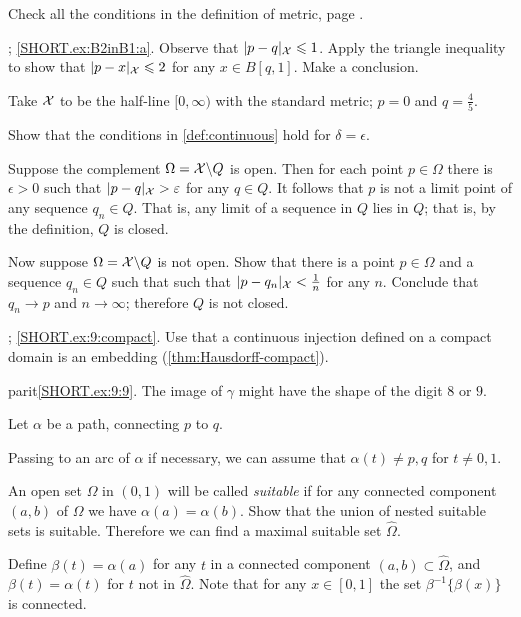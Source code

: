 \setcounter{eqtn}{0}

 Check all the conditions in the definition of metric, page \pageref{page:def:metric}.

\parbf{\ref{ex:B2inB1}}; \ref{SHORT.ex:B2inB1:a}.
Observe that $\dist{p}{q}{\spc{X}}\le 1$. 
Apply the triangle inequality to show that $\dist{p}{x}{\spc{X}}\le 2$ for any $x\in B[q,1]$.
Make a conclusion.

 Take $\mathcal{X}$ to be the half-line $[0,\infty)$ with the standard metric; $p=0$ and $q=\tfrac45$.

 Show that the conditions in \ref{def:continuous} hold for $\delta=\epsilon$.

Suppose the complement $\Omega=\mathcal{X}\backslash Q$ is open.
Then for each point $p\in \Omega$ there is $\epsilon>0$ such that $\dist{p}{q}{\spc{X}}>\epsilon$ for any $q\in Q$.
It follows that $p$ is not a limit point of any sequence $q_n\in Q$.
That is, any limit of a sequence in $Q$ lies in $Q$;
that is, by the definition, $Q$ is closed.

Now suppose $\Omega=\mathcal{X}\backslash Q$ is not open.
Show that there is a point $p\in \Omega$ and a sequence $q_n\in Q$ such that such that $\dist{p}{q_n}{\spc{X}}\z<\tfrac 1n$ for any $n$.
Conclude that $q_n\to p$ and $n\to \infty$;
therefore $Q$ is not closed.

\setcounter{eqtn}{0}

\parbf{\ref{ex:9}}; \ref{SHORT.ex:9:compact}. Use that a continuous injection defined on a compact domain is an embedding (\ref{thm:Hausdorff-compact}).

parit{\ref{SHORT.ex:9:9}.} The image of $\gamma$ might have the shape of the digit $8$ or $9$.



Let $\alpha$ be a path, connecting $p$ to $q$.

Passing to an arc of $\alpha$ if necessary,
we can assume that $\alpha(t)\ne p,q$ for $t\ne0,1$.

An open set $\Omega$ in $(0,1)$ will be called {}\emph{suitable}
if for any connected component $(a,b)$ of $\Omega$ we have $\alpha(a)=\alpha(b)$.
Show that the union of nested suitable sets is suitable.
Therefore we can find a maximal suitable set $\hat \Omega$.

Define $\beta(t)=\alpha(a)$ for any $t$ in a connected component $(a,b)\subset\hat \Omega$, and $\beta (t) = \alpha (t) $ for $t$ not in $\hat{\Omega}$.
Note that for any $x\in [0,1]$ the set $\beta^{-1}\{\beta(x)\}$ is connected.

